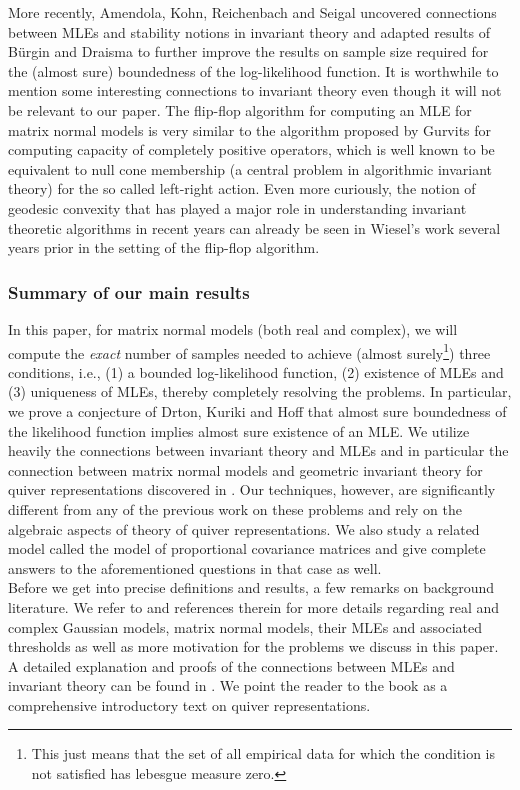 \documentclass[11pt]{amsart}
\theoremstyle{definition}
\begin{document}
More recently,  Amendola, Kohn, Reichenbach and Seigal \cite{AKRS} uncovered connections between MLEs and stability notions in invariant theory and adapted results of B\"urgin and Draisma \cite{BD06} to further improve the results on sample size required for the (almost sure) boundedness of the log-likelihood function. It is worthwhile to mention some interesting connections to invariant theory even though it will not be relevant to our paper. The flip-flop algorithm for computing an MLE for matrix normal models \cite{Dut99, LZ05} is very similar to the algorithm proposed by Gurvits \cite{Gurvits} for computing capacity of completely positive operators, which is well known to be equivalent to null cone membership (a central problem in algorithmic invariant theory) for the so called left-right action. Even more curiously, the notion of geodesic convexity that has played a major role in understanding invariant theoretic algorithms in recent years \cite{BFGOWW} can already be seen in Wiesel's work \cite{Wiesel} several years prior in the setting of the flip-flop algorithm.


\subsubsection*{\bf Summary of our main results} In this paper, for matrix normal models (both real and complex), we will compute the {\em exact} number of samples needed to achieve (almost surely\footnote{This just means that the set of all empirical data for which the condition is not satisfied has lebesgue measure zero.}) three conditions, i.e., (1) a bounded log-likelihood function, (2) existence of MLEs and (3) uniqueness of MLEs, thereby completely resolving the problems. In particular, we prove a conjecture of Drton, Kuriki and Hoff \cite{Drton-etal} that almost sure boundedness of the likelihood function implies almost sure existence of an MLE. We utilize heavily the connections between invariant theory and MLEs and in particular the connection between matrix normal models and geometric invariant theory for quiver representations discovered in \cite{AKRS}. Our techniques, however, are significantly different from any of the previous work on these problems and rely on the algebraic aspects of theory of quiver representations. We also study a related model called the model of proportional covariance matrices and give complete answers to the aforementioned questions in that case as well. \\


Before we get into precise definitions and results, a few remarks on background literature. We refer to \cite{AKRS, Drton-etal} and references therein for more details regarding real and complex Gaussian models, matrix normal models, their MLEs and associated thresholds as well as more motivation for the problems we discuss in this paper. A detailed explanation and proofs of the connections between MLEs and invariant theory can be found in \cite{AKRS}. We point the reader to the book \cite{DW-book} as a comprehensive introductory text on quiver representations. 
\end{document}
